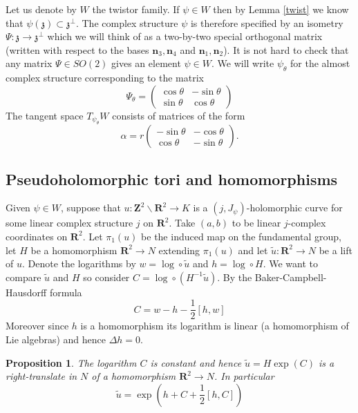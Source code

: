 \documentclass[11pt]{amsart}
\newcommand{\RR}{\mathbf{R}}
\newcommand{\ZZ}{\mathbf{Z}}
\newcommand{\WW}{W}
\newcommand{\torus}{\ZZ^2\backslash\RR^2}
\newcommand{\zz}{\mathfrak{z}}
\numberwithin{equation}{section}
\newtheorem{prp}[equation]{Proposition}
\theoremstyle{definition}
\theoremstyle{remark}
\begin{document}
Let us denote by $\WW$ the twistor family. If $\psi\in\WW$ then by Lemma \ref{twist} we know that $\psi(\zz)\subset\zz^{\perp}$. The complex structure $\psi$ is therefore specified by an isometry $\Psi\colon \zz\to \zz^{\perp}$ which we will think of as a two-by-two special orthogonal matrix (written with respect to the bases $\mathbf{n}_3,\mathbf{n}_4$ and $\mathbf{n}_1,\mathbf{n}_2$). It is not hard to check that any matrix $\Psi\in SO(2)$ gives an element $\psi\in\WW$. We will write $\psi_{\theta}$ for the almost complex structure corresponding to the matrix
\[\Psi_{\theta}=\left(\begin{array}{cc}
\cos\theta & -\sin\theta\\
\sin\theta & \cos\theta
\end{array}\right)\]
The tangent space $T_{\psi_{\theta}}\WW$ consists of matrices of the form
\[\alpha=r\left(\begin{array}{cc}
-\sin\theta & -\cos\theta\\
\cos\theta & -\sin\theta
\end{array}\right).\]


\subsection{Pseudoholomorphic tori and homomorphisms}

Given $\psi\in\WW$, suppose that $u\colon\torus\to K$ is a $(j,J_{\psi})$-holomorphic curve for some linear complex structure $j$ on $\RR^2$. Take $(a,b)$ to be linear $j$-complex coordinates on $\RR^2$. Let $\pi_1(u)$ be the induced map on the fundamental group, let $H$ be a homomorphism $\RR^2\to N$ extending $\pi_1(u)$ and let $\tilde{u}\colon\RR^2\to N$ be a lift of $u$. Denote the logarithms by $w=\log\circ\tilde{u}$ and $h=\log\circ H$. We want to compare $\tilde{u}$ and $H$ so consider $C=\log\circ(H^{-1}\tilde{u})$. By the Baker-Campbell-Hausdorff formula
\[C=w-h-\frac{1}{2}[h,w]\]
Moreover since $h$ is a homomorphism its logarithm is linear (a homomorphism of Lie algebras) and hence $\Delta h=0$.

\begin{prp}\label{classiftori}
The logarithm $C$ is constant and hence $\tilde{u}=H\exp(C)$ is a right-translate in $N$ of a homomorphism $\RR^2\to N$. In particular
\[\tilde{u}=\exp\left(h+C+\frac{1}{2}[h,C]\right)\]
\end{prp}
\end{document}
